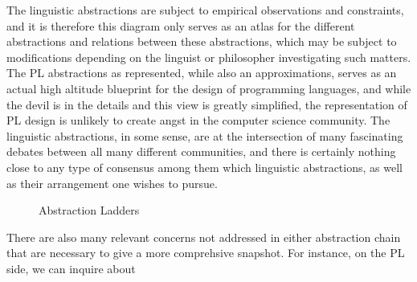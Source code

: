 The linguistic abstractions are subject to empirical observations and
constraints, and it is therefore this diagram only serves as an atlas for the
different abstractions and relations between these abstractions, which may be
subject to modifications depending on the linguist or philosopher investigating
such matters. The PL abstractions as represented, while also an approximations,
serves as an actual high altitude blueprint for the design of programming
languages, and while the devil is in the details and this view is greatly
simplified, the representation of PL design is unlikely to create angst in the
computer science community. The linguistic abstractions, in some sense, are at
the intersection of many fascinating debates between all many different
communities, and there is certainly nothing close to any type of consensus among
them which linguistic abstractions, as well as their arrangement one wishes to
pursue.

\begin{figure}
\centering
{}
\hspace{1cm}
\caption{Abstraction Ladders} \label{fig:M1}
\end{figure}


There are also many relevant concerns not addressed in either abstraction chain
that are necessary to give a more comprehsive snapshot. For instance, on the PL
side, we can inquire about 

